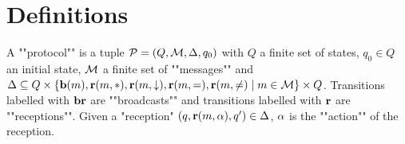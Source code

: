 \section{Definitions}

\begin{definition}
	A ""protocol"" is a tuple $\mathcal{P} = (Q, \mathcal{M}, \Delta, q_0)$  with $Q$ a finite set of states, $q_0 \in Q$ an initial state, $\mathcal{M}$ a finite set of ""messages""  and $\Delta \subseteq Q \times \{\textbf{b}(m), \textbf{r}(m, {*}), \textbf{r}(m, \downarrow), \textbf{r}(m, {=}), \textbf{r}(m, {\ne}) \mid m \in \mathcal{M}\} \times Q$. Transitions labelled with $\textbf{br}$ are ""broadcasts"" and transitions labelled with $\textbf{r}$ are ""receptions"".
Given a "reception" $(q,\textbf{r}(m, \alpha), q') \in \Delta$, $\alpha$ is the ""action"" of the reception.
\end{definition}


